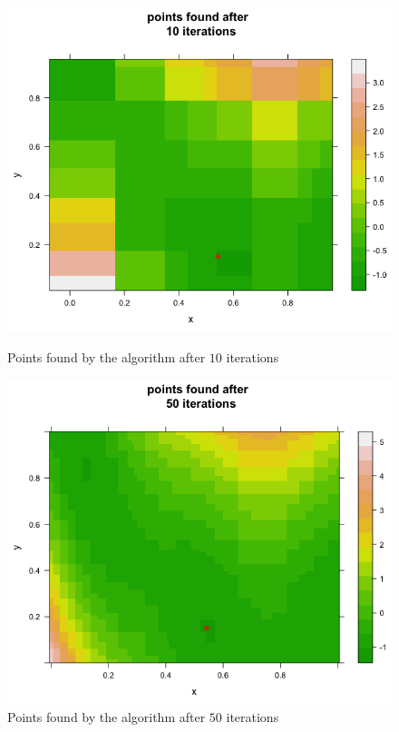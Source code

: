 \begin{figure}[!htb]
    \centering
    \begin{minipage}{.5\textwidth}
        \centering
        \includegraphics[width=1.064\linewidth, height=0.32\textheight]{gfx/chapter-bayesianrvfl/min_branin_10_iter.png}
        \caption{Points found by the algorithm after $10$ iterations}
        \label{min_branin_10_iter}
    \end{minipage}%
    \begin{minipage}{0.5\textwidth}
        \centering
        \includegraphics[width=1.064\linewidth, height=0.32\textheight]{gfx/chapter-bayesianrvfl/min_branin_50_iter.png}
        \caption{Points found by the algorithm after $50$ iterations}
        \label{min_branin_50_iter}
    \end{minipage}
\end{figure}
